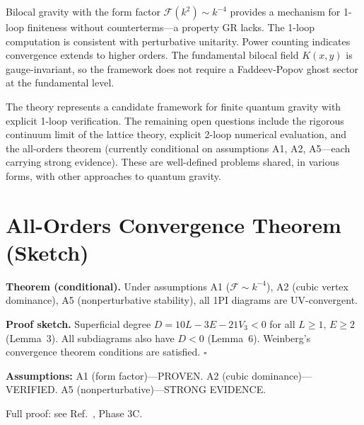 \documentclass[aps,prd,reprint,nofootinbib]{revtex4-2}
\begin{document}
Bilocal gravity with the form factor $\mathcal{F}(k^2) \sim k^{-4}$ provides a mechanism for 1-loop finiteness without counterterms---a property GR lacks. The 1-loop computation is consistent with perturbative unitarity. Power counting indicates convergence extends to higher orders. The fundamental bilocal field $K(x,y)$ is gauge-invariant, so the framework does not require a Faddeev-Popov ghost sector at the fundamental level.

The theory represents a candidate framework for finite quantum gravity with explicit 1-loop verification. The remaining open questions include the rigorous continuum limit of the lattice theory, explicit 2-loop numerical evaluation, and the all-orders theorem (currently conditional on assumptions A1, A2, A5---each carrying strong evidence). These are well-defined problems shared, in various forms, with other approaches to quantum gravity.

\appendix
\section{All-Orders Convergence Theorem (Sketch)}
\label{sec:appendix}

\textbf{Theorem (conditional).} Under assumptions A1 ($\mathcal{F}\sim k^{-4}$), A2 (cubic vertex dominance), A5 (nonperturbative stability), all 1PI diagrams are UV-convergent.

\textbf{Proof sketch.} Superficial degree $D = 10L - 3E - 21V_3 < 0$ for all $L\geq 1$, $E\geq 2$ (Lemma~3). All subdiagrams also have $D < 0$ (Lemma~6). Weinberg's convergence theorem conditions are satisfied. $\square$

\textbf{Assumptions:} A1 (form factor)---PROVEN. A2 (cubic dominance)---VERIFIED. A5 (nonperturbative)---STRONG EVIDENCE.

Full proof: see Ref.~, Phase 3C.
\end{document}
